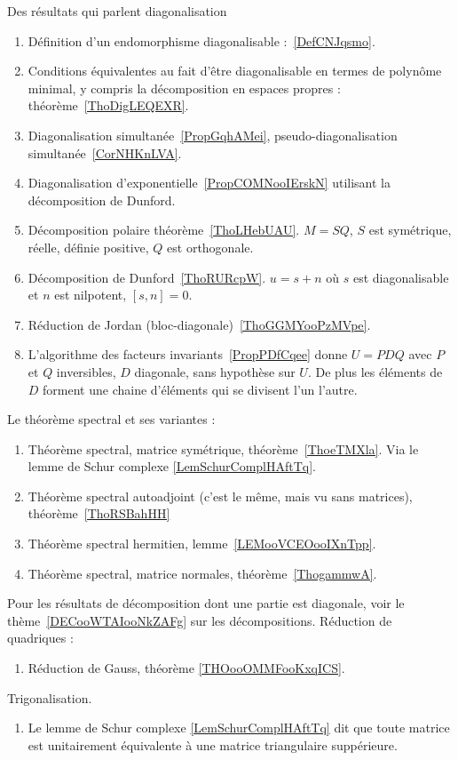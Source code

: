 
Des résultats qui parlent diagonalisation
\begin{enumerate}
	\item
	      Définition d'un endomorphisme diagonalisable :~\ref{DefCNJqsmo}.
	\item
	      Conditions équivalentes au fait d'être diagonalisable en termes de polynôme minimal, y compris la décomposition en espaces propres : théorème~\ref{ThoDigLEQEXR}.
	\item
	      Diagonalisation simultanée~\ref{PropGqhAMei}, pseudo-diagonalisation simultanée~\ref{CorNHKnLVA}.
	\item
	      Diagonalisation d'exponentielle~\ref{PropCOMNooIErskN} utilisant la décomposition de Dunford.
	\item
	      Décomposition polaire théorème~\ref{ThoLHebUAU}. \( M=SQ\), \( S\) est symétrique, réelle, définie positive, \( Q\) est orthogonale.
	\item
	      Décomposition de Dunford~\ref{ThoRURcpW}. \( u=s+n\) où \( s\) est diagonalisable et \( n\) est nilpotent, \( [s,n]=0\).
	\item
	      Réduction de Jordan (bloc-diagonale)~\ref{ThoGGMYooPzMVpe}.
	\item
	      L'algorithme des facteurs invariants~\ref{PropPDfCqee} donne \( U=PDQ\) avec \( P\) et \( Q\) inversibles, \( D\) diagonale, sans hypothèse sur \( U\). De plus les éléments de \( D\) forment une chaine d'éléments qui se divisent l'un l'autre.
\end{enumerate}
Le théorème spectral et ses variantes :
\begin{enumerate}
	\item
	      Théorème spectral, matrice symétrique, théorème~\ref{ThoeTMXla}. Via le lemme de Schur complexe \ref{LemSchurComplHAftTq}.
	\item
	      Théorème spectral autoadjoint (c'est le même, mais vu sans matrices), théorème~\ref{ThoRSBahHH}
	\item
	      Théorème spectral hermitien, lemme~\ref{LEMooVCEOooIXnTpp}.
	\item
	      Théorème spectral, matrice normales, théorème~\ref{ThogammwA}.
\end{enumerate}
Pour les résultats de décomposition dont une partie est diagonale, voir le thème~\ref{DECooWTAIooNkZAFg} sur les décompositions.
Réduction de quadriques :
\begin{enumerate}
	\item
	      Réduction de Gauss, théorème \ref{THOooOMMFooKxqICS}.
\end{enumerate}

Trigonalisation.
\begin{enumerate}
    \item
        Le lemme de Schur complexe \ref{LemSchurComplHAftTq} dit que toute matrice est unitairement équivalente à une matrice triangulaire suppérieure.
\end{enumerate}
